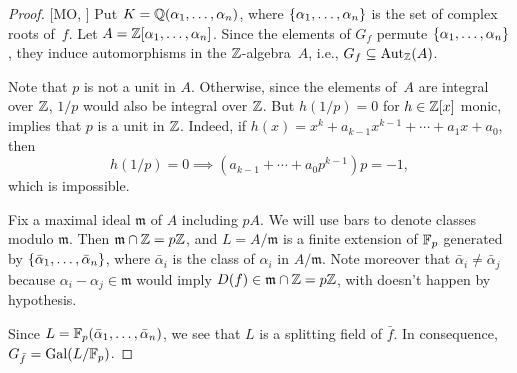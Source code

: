 \begin{proof} {[MO, \citeauthor{386280}]} Put $K=\mathbb{Q}(\alpha_1,\dots,\alpha_n)$, where $\{\alpha_1,\dots,\alpha_n\}$ is the set of complex roots of~$f$. Let $A=\mathbb{Z}[\alpha_1,\dots,\alpha_n]$. Since the elements of $G_f$ permute $\{\alpha_1,\dots,\alpha_n\}$, they induce automorphisms in the $\mathbb{Z}$-algebra~$A$, i.e., $G_f\subseteq{\rm Aut}_{\mathbb{Z}}(A)$.

    Note that $p$ is not a unit in $A$. Otherwise, since the elements of~$A$ are integral over $\mathbb{Z}$, $1/p$ would also be integral over $\mathbb{Z}$. But $h(1/p)=0$ for $h\in\mathbb{Z}[x]$ monic, implies that $p$ is a unit in $\mathbb{Z}$. Indeed, if $h(x)=x^k+a_{k-1}x^{k-1}+\cdots+a_1x+a_0$, then 
    $$
        h(1/p)=0\implies (a_{k-1}+\cdots+a_0p^{k-1})p=-1,
    $$
    which is impossible.

    Fix a maximal ideal $\mathfrak m$ of $A$ including $pA$. We will use bars to denote classes modulo $\mathfrak m$. Then $\mathfrak m\cap\mathbb{Z}=p\mathbb{Z}$, and $L=A/\mathfrak m$ is a finite extension of $\mathbb F_p$ generated by $\{\bar\alpha_1,\dots,\bar\alpha_n\}$, where $\bar\alpha_i$ is the class of $\alpha_i$ in $A/\mathfrak m$. Note moreover that $\bar\alpha_i\ne\bar\alpha_j$ because $\alpha_i-\alpha_j\in\mathfrak m$ would imply $D(f)\in\mathfrak m\cap\mathbb{Z}=p\mathbb{Z}$, with doesn't happen by hypothesis.

    Since $L=\mathbb F_p(\bar\alpha_1,\dots,\bar\alpha_n)$, we see that $L$ is a splitting field of $\bar f$. In consequence, $G_{\bar f}=\operatorname{Gal}(L/\mathbb F_p)$.


\end{proof}
